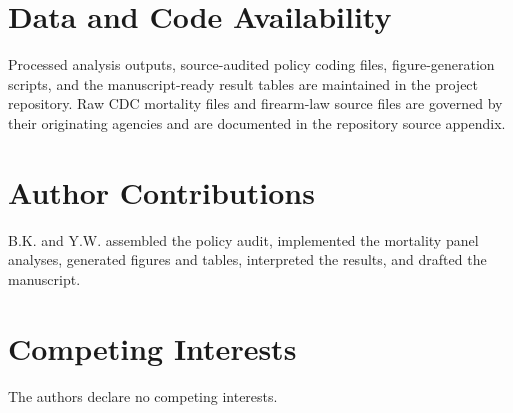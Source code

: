 \documentclass[11pt]{article}
\begin{document}
\section*{Data and Code Availability}

Processed analysis outputs, source-audited policy coding files, figure-generation scripts, and the manuscript-ready result tables are maintained in the project repository. Raw CDC mortality files and firearm-law source files are governed by their originating agencies and are documented in the repository source appendix.

\section*{Author Contributions}

B.K. and Y.W. assembled the policy audit, implemented the mortality panel analyses, generated figures and tables, interpreted the results, and drafted the manuscript.

\section*{Competing Interests}

The authors declare no competing interests.



\end{document}
